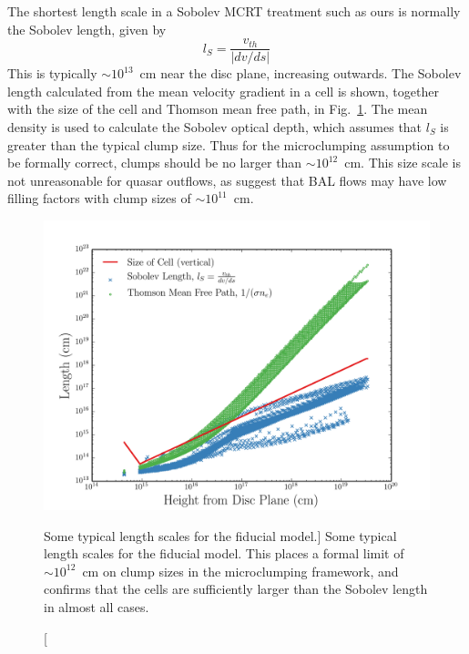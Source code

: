 The shortest length scale in a Sobolev MCRT treatment such as ours 
is normally the Sobolev length, given by
\begin{equation}
l_S = \frac{v_{th}}{| dv/ds |}
\end{equation}
This is typically $\sim10^{13}$~cm near the disc plane, increasing outwards.
The Sobolev length calculated from the mean velocity gradient in a cell
is shown, together with the size of the cell
and Thomson mean free path, in Fig.~\ref{fig:length_scales}.
The mean density is used to calculate the Sobolev optical depth, 
which assumes that $l_S$ is greater than the typical clump size.
Thus for the microclumping assumption to be formally correct, 
clumps should be no larger than $\sim10^{12}$~cm.
This size scale is not unreasonable for quasar outflows, as
\cite{dekool1995} suggest that BAL flows may have low filling factors with
clump sizes of $\sim10^{11}$~cm.
\begin{figure} 
\centering
\includegraphics[width=1.0\textwidth]{figures/06-agnpaper/size_of_clumps.png}
\caption
[Some typical length scales for the fiducial model.]
{
Some typical length scales for the fiducial model. 
This places a formal limit of $\sim10^{12}$~cm on clump sizes 
in the microclumping framework, and confirms that the cells are sufficiently
larger than the Sobolev length in almost all cases.
}
\label{fig:length_scales}
\end{figure} 

